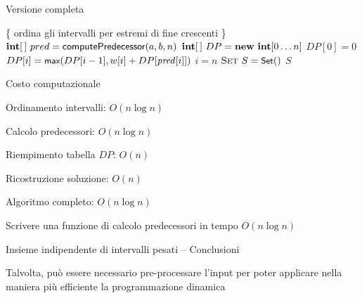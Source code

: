 \begin{frame}[shrink=10]{Versione completa}

\vspace{-12pt}
\begin{Procedure}
\caption[A]{\Set\ \maxinterval($\INTARRAY\ a,\ \INTARRAY\ b,\ \INTARRAY w$, \INTEGER $n$)}	

\{ ordina gli intervalli per estremi di fine crescenti \}\;
$\INTARRAY\ pred = \textsf{computePredecessor}(a,b,n)$\;
$\INTARRAY\ DP = \NEW\ \INTEGER[0 \mldots n]$\;
$DP[0] = 0$\;
{
  $DP[i] = \textsf{{\small max}}(DP[i-1], w[i] + DP[\mathit{pred}[i]])$\;
}
$i = n$\;
$\textsc{Set}\ S = \textsf{{\small Set}}()$\;
{
}
\Return $S$\;
\end{Procedure}

\end{frame}

\begin{frame}{Costo computazionale}

\vspace{-9pt}
\begin{myboxtitle}
\BIL
\item Ordinamento intervalli: \alert{$O(n \log n)$}
\item Calcolo predecessori: \alert{$O(n \log n)$}
\item Riempimento tabella $DP$: \alert{$O(n)$}
\item Ricostruzione soluzione: \alert{$O(n)$}
\item Algoritmo completo: \alert{$O(n \log n)$}
\EIL
\end{myboxtitle}

\begin{myboxtitle}[Esercizio]
Scrivere una funzione di calcolo predecessori in tempo $O(n \log n)$
\end{myboxtitle}

\end{frame}

\begin{frame}{Insieme indipendente di intervalli pesati -- Conclusioni}

\vspace{-6pt}
\begin{myboxtitle}
Talvolta, può essere necessario pre-processare l'input per poter applicare nella maniera più efficiente la programmazione dinamica
\end{myboxtitle}

\end{frame}

